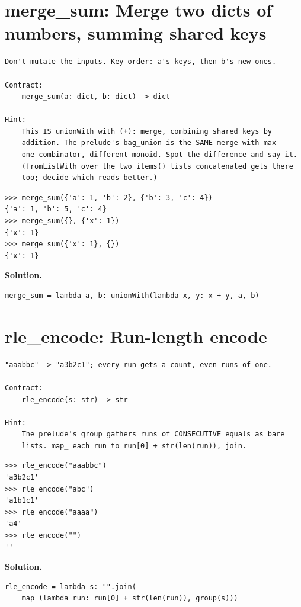 \documentclass[10pt,letterpaper]{book}
\begin{document}
\section{merge\_sum: Merge two dicts of numbers, summing shared keys}
\begin{lstlisting}[style=ex]
Don't mutate the inputs. Key order: a's keys, then b's new ones.

Contract:
    merge_sum(a: dict, b: dict) -> dict

Hint:
    This IS unionWith with (+): merge, combining shared keys by
    addition. The prelude's bag_union is the SAME merge with max --
    one combinator, different monoid. Spot the difference and say it.
    (fromListWith over the two items() lists concatenated gets there
    too; decide which reads better.)
\end{lstlisting}
\begin{lstlisting}[style=ex]
>>> merge_sum({'a': 1, 'b': 2}, {'b': 3, 'c': 4})
{'a': 1, 'b': 5, 'c': 4}
>>> merge_sum({}, {'x': 1})
{'x': 1}
>>> merge_sum({'x': 1}, {})
{'x': 1}
\end{lstlisting}
\noindent\textbf{Solution.}
\begin{lstlisting}[style=code]
merge_sum = lambda a, b: unionWith(lambda x, y: x + y, a, b)
\end{lstlisting}

\section{rle\_encode: Run-length encode}
\begin{lstlisting}[style=ex]
"aaabbc" -> "a3b2c1"; every run gets a count, even runs of one.

Contract:
    rle_encode(s: str) -> str

Hint:
    The prelude's group gathers runs of CONSECUTIVE equals as bare
    lists. map_ each run to run[0] + str(len(run)), join.
\end{lstlisting}
\begin{lstlisting}[style=ex]
>>> rle_encode("aaabbc")
'a3b2c1'
>>> rle_encode("abc")
'a1b1c1'
>>> rle_encode("aaaa")
'a4'
>>> rle_encode("")
''
\end{lstlisting}
\noindent\textbf{Solution.}
\begin{lstlisting}[style=code]
rle_encode = lambda s: "".join(
    map_(lambda run: run[0] + str(len(run)), group(s)))
\end{lstlisting}
\end{document}
